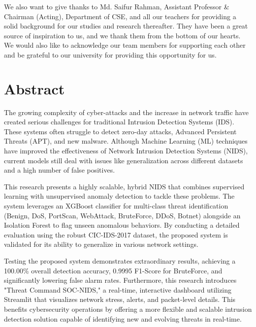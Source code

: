 \documentclass[12pt, a4paper]{report}
\begin{document}
We also want to give thanks to Md. Saifur Rahman, Assistant Professor \& Chairman (Acting), Department of CSE, and all our teachers for providing a solid background for our studies and research thereafter. They have been a great source of inspiration to us, and we thank them from the bottom of our hearts. We would also like to acknowledge our team members for supporting each other and be grateful to our university for providing this opportunity for us.
\clearpage

\chapter*{Abstract}
{}
The growing complexity of cyber-attacks and the increase in network traffic have created serious challenges for traditional Intrusion Detection Systems (IDS). These systems often struggle to detect zero-day attacks, Advanced Persistent Threats (APT), and new malware. Although Machine Learning (ML) techniques have improved the effectiveness of Network Intrusion Detection Systems (NIDS), current models still deal with issues like generalization across different datasets and a high number of false positives.

This research presents a highly scalable, hybrid NIDS that combines supervised learning with unsupervised anomaly detection to tackle these problems. The system leverages an XGBoost classifier for multi-class threat identification (Benign, DoS, PortScan, WebAttack, BruteForce, DDoS, Botnet) alongside an Isolation Forest to flag unseen anomalous behaviors. By conducting a detailed evaluation using the robust CIC-IDS-2017 dataset, the proposed system is validated for its ability to generalize in various network settings.

Testing the proposed system demonstrates extraordinary results, achieving a 100.00\% overall detection accuracy, 0.9995 F1-Score for BruteForce, and significantly lowering false alarm rates. Furthermore, this research introduces "Threat Command SOC-NIDS," a real-time, interactive dashboard utilizing Streamlit that visualizes network stress, alerts, and packet-level details. This benefits cybersecurity operations by offering a more flexible and scalable intrusion detection solution capable of identifying new and evolving threats in real-time.
\clearpage

\renewcommand{\contentsname}{Table of Contents}
\tableofcontents
\clearpage
\end{document}
